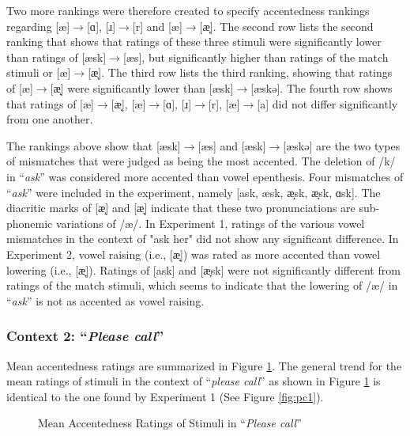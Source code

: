 Two more rankings were therefore created to specify accentedness rankings regarding  [æ]$\rightarrow$[ɑ], [ɹ]$\rightarrow$[r] and [æ]$\rightarrow$[æ̞]. The second row lists the second ranking that shows that ratings of these three stimuli were significantly lower than ratings of [æsk]$\rightarrow$[æs], but significantly higher than ratings of the match stimuli or [æ]$\rightarrow$[æ̞]. The third row lists the third ranking, showing that ratings of [æ]$\rightarrow$[æ̝] were significantly lower than [æsk]$\rightarrow$[æskə]. The fourth row shows that ratings of [æ]$\rightarrow$[æ̝], [æ]$\rightarrow$[ɑ], [ɹ]$\rightarrow$[r], [æ]$\rightarrow$[a] did not differ significantly from one another. 

The rankings above show that [æsk]$\rightarrow$[æs] and [æsk]$\rightarrow$[æskə] are the two types of mismatches that were judged as being the most accented. The deletion of /k/ in “\textit{ask}” was considered more accented than vowel epenthesis. Four mismatches of “\textit{ask}” were included in the experiment, namely [ask, æsk, æ̝sk, æ̞sk, ɑsk]. The diacritic marks of [æ̝] and [æ̞] indicate that these two pronunciations are sub-phonemic variations of /æ/. In Experiment 1, ratings of the various vowel mismatches in the context of "ask her" did not show any significant difference. In Experiment 2, vowel raising (i.e., [æ̝]) was rated as more accented than vowel lowering (i.e., [æ̞]). Ratings of [ask] and [æ̞sk] were not significantly different from ratings of the match stimuli, which seems to indicate that the lowering of /æ/ in “\textit{ask}” is not as accented as vowel raising. 

\subsubsection{Context 2: “\textit{Please call}”}
Mean accentedness ratings are summarized in Figure \ref{fig:pc2}. The general trend for the mean ratings of stimuli in the context of “\textit{please call}” as shown in Figure \ref{fig:pc2} is identical to the one found by Experiment 1 (See Figure \ref{fig:pc1}). 

\begin{figure}[!h]
  \figSpace
\centering

\caption{Mean Accentedness Ratings of Stimuli in “\textit{Please call}”}
\label{fig:pc2}
\figSpace
\end{figure}

